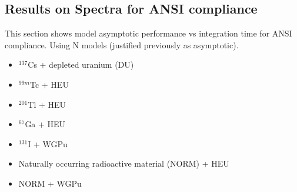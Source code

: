 






\subsection{Results on Spectra for ANSI compliance}

This section shows model asymptotic performance vs integration time for ANSI compliance. Using N models (justified previously as asymptotic). 


\begin{itemize}
  \item $^{137}$Cs + depleted uranium (DU)
  \item $^{99m}$Tc + HEU
  \item $^{201}$Tl + HEU
  \item $^{67}$Ga + HEU
  \item $^{131}$I + WGPu
  \item Naturally occurring radioactive material (NORM) + HEU
  \item NORM + WGPu
\end{itemize}


